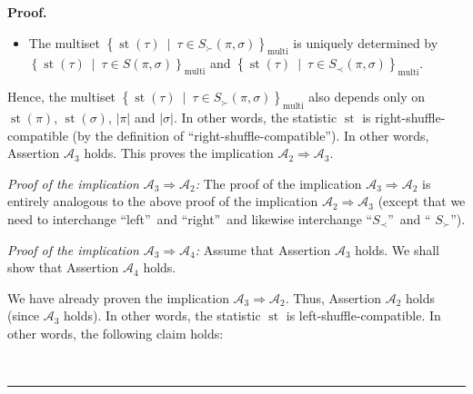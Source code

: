 \documentclass[numbers=enddot,12pt,final,onecolumn,notitlepage]{scrartcl}%
\theoremstyle{definition}
\newenvironment{proof}[1][Proof]{\noindent\textbf{#1.} }{\ \rule{0.5em}{0.5em}}
\begin{document}
\begin{proof}
\begin{itemize}
\item The multiset $\left\{  \operatorname*{st}\left(  \tau\right)
\ \mid\ \tau\in S_{\succ}\left(  \pi,\sigma\right)  \right\}
_{\operatorname*{multi}}$ is uniquely determined by \newline$\left\{
\operatorname*{st}\left(  \tau\right)  \ \mid\ \tau\in S\left(  \pi
,\sigma\right)  \right\}  _{\operatorname*{multi}}$ and $\left\{
\operatorname*{st}\left(  \tau\right)  \ \mid\ \tau\in S_{\prec}\left(
\pi,\sigma\right)  \right\}  _{\operatorname*{multi}}$.
\end{itemize}

Hence, the multiset $\left\{  \operatorname*{st}\left(  \tau\right)
\ \mid\ \tau\in S_{\succ}\left(  \pi,\sigma\right)  \right\}
_{\operatorname*{multi}}$ also depends only on $\operatorname*{st}\left(
\pi\right)  $, $\operatorname*{st}\left(  \sigma\right)  $, $\left\vert
\pi\right\vert $ and $\left\vert \sigma\right\vert $. In other words, the
statistic $\operatorname*{st}$ is right-shuffle-compatible (by the definition
of \textquotedblleft right-shuffle-compatible\textquotedblright). In other
words, Assertion $\mathcal{A}_{3}$ holds. This proves the implication
$\mathcal{A}_{2}\Longrightarrow\mathcal{A}_{3}$.

\textit{Proof of the implication }$\mathcal{A}_{3}\Longrightarrow
\mathcal{A}_{2}$\textit{:} The proof of the implication $\mathcal{A}%
_{3}\Longrightarrow\mathcal{A}_{2}$ is entirely analogous to the above proof
of the implication $\mathcal{A}_{2}\Longrightarrow\mathcal{A}_{3}$ (except
that we need to interchange \textquotedblleft left\textquotedblright\ and
\textquotedblleft right\textquotedblright\ and likewise interchange
\textquotedblleft$S_{\prec}$\textquotedblright\ and \textquotedblleft%
$S_{\succ}$\textquotedblright).

\textit{Proof of the implication }$\mathcal{A}_{3}\Longrightarrow
\mathcal{A}_{4}$\textit{:} Assume that Assertion $\mathcal{A}_{3}$ holds. We
shall show that Assertion $\mathcal{A}_{4}$ holds.

We have already proven the implication $\mathcal{A}_{3}\Longrightarrow
\mathcal{A}_{2}$. Thus, Assertion $\mathcal{A}_{2}$ holds (since
$\mathcal{A}_{3}$ holds). In other words, the statistic $\operatorname*{st}$
is left-shuffle-compatible. In other words, the following claim holds:


\end{proof}
\end{document}
